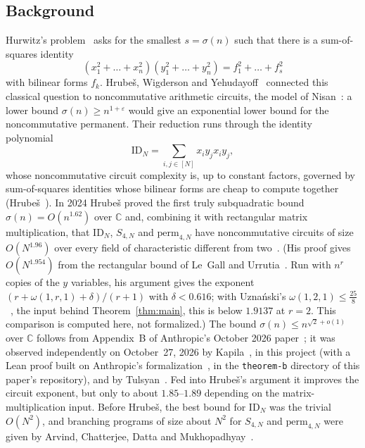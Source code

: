\documentclass[11pt]{article}
\theoremstyle{definition}
\theoremstyle{remark}
\newcommand{\C}{\mathbb{C}}
\newcommand{\ID}{\mathrm{ID}}
\begin{document}
\subsection{Background}
Hurwitz's problem~\cite{Hurwitz1898,Radon1922,Shapiro2000} asks for the smallest $s=\sigma(n)$ such that there is a
sum-of-squares identity
\begin{equation}\label{eq:sos}
(x_1^2+\dots+x_n^2)(y_1^2+\dots+y_n^2)=f_1^2+\dots+f_s^2
\end{equation}
with bilinear forms $f_k$. Hrube\v{s}, Wigderson and Yehudayoff~\cite{HWY2011} connected this classical question
to noncommutative arithmetic circuits, the model of Nisan~\cite{Nisan1991}: a lower bound $\sigma(n)\ge
n^{1+\varepsilon}$ would give an exponential lower bound for the noncommutative permanent. Their reduction runs
through the identity polynomial
\[
\ID_N=\sum_{i,j\in[N]}x_iy_jx_iy_j ,
\]
whose noncommutative circuit complexity is, up to constant factors, governed by sum-of-squares identities whose
bilinear forms are cheap to compute together (Hrube\v{s}~\cite[Lemma~22]{Hrubes2026}). In 2024 Hrube\v{s} proved the
first truly subquadratic bound $\sigma(n)=O(n^{1.62})$ over $\C$ and, combining it with rectangular matrix
multiplication, that $\ID_N$, $S_{4,N}$ and $\mathrm{perm}_{4,N}$ have noncommutative circuits of size
$O(N^{1.96})$ over every field of characteristic different from two~\cite{Hrubes2024,Hrubes2026}. (His proof gives
$O(N^{1.954})$ from the rectangular bound of Le~Gall and Urrutia~\cite{LeGallUrrutia2018}. Run with $n^r$ copies
of the $y$ variables, his argument gives the exponent $(r+\omega(1,r,1)+\delta)/(r+1)$ with $\delta<0.616$; with
Uzna\'nski's $\omega(1,2,1)\le\frac{25}{8}$~\cite{Uznanski2026}, the input behind Theorem~\ref{thm:main}, this is
below $1.9137$ at $r=2$. This comparison is computed here, not formalized.) The bound $\sigma(n)\le n^{\sqrt2+o(1)}$ over $\C$ follows from Appendix~B of Anthropic's October 2026
paper~\cite{Anthropic3SAT}; it was observed independently on October~27, 2026 by Kapila~\cite{Kapila2026}, in
this project (with a Lean proof built on Anthropic's formalization~\cite{AnthropicFormalMath}, in the
\texttt{theorem-b} directory of this paper's repository), and by
Tulsyan~\cite{Tulsyan2026}. Fed into Hrube\v{s}'s argument it improves the circuit exponent, but only to about
$1.85$--$1.89$ depending on the matrix-multiplication input. Before Hrube\v{s}, the best bound for $\ID_N$ was the
trivial $O(N^2)$, and branching programs of size about $N^2$ for $S_{4,N}$ and $\mathrm{perm}_{4,N}$ were given by
Arvind, Chatterjee, Datta and Mukhopadhyay~\cite{ACDM2019}.
\end{document}
